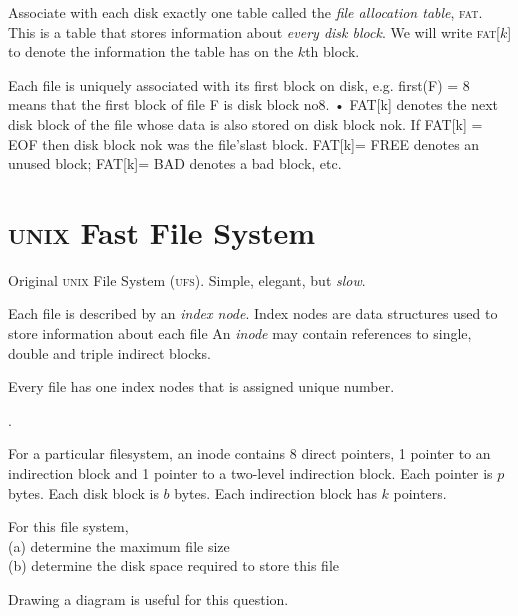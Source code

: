 Associate with each disk exactly one table 
called the \textit{file allocation table}, \textsc{fat}.
This is a table that stores information about \textit{every disk block}. 
We will write \textsc{fat}[$k$] to denote the information the table has on the $k$th block.

Each file is uniquely associated with its ﬁrst block
on disk, e.g. ﬁrst(F) = 8 means that the ﬁrst block
of ﬁle F is disk block no8.
• FAT[k] denotes the next disk block of the ﬁle whose
data is also stored on disk block nok.
If FAT[k] = EOF then disk block nok was the ﬁle’slast block.
FAT[k]= FREE denotes an unused block; FAT[k]=
BAD denotes a bad block, etc.


\section{\textsc{unix} Fast File System}

Original \textsc{unix} File System (\textsc{ufs}).
Simple, elegant, but \textit{slow}.


Each file is described by an \textit{index node}.
Index nodes are data structures used to store information about each file
An \textit{inode} may contain references to single, double 
and triple indirect blocks.

Every file has one index nodes that is assigned unique number.




.

\begin{example}
For a particular filesystem, an inode contains 8 direct pointers, 
1 pointer to an indirection block and 1 pointer to a 
two-level indirection block. 
Each pointer is $p$ bytes. Each disk block is $b$ bytes.
Each indirection block has $k$ pointers.

For this file system, \\
(a) determine the maximum file size \\
(b) determine the disk space required to store this file
\end{example}


Drawing a diagram is useful for this question. 


